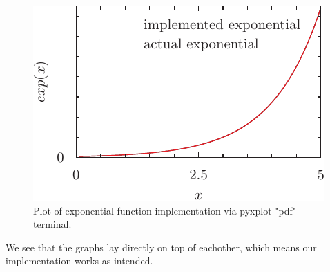 \documentclass[twocolumn]{article}
\begin{document}
\begin{figure}[h]
	\includegraphics{fig-pyxplot.pdf}
	\caption{Plot of exponential function implementation via pyxplot "pdf" terminal.}
	\label{fig:expimp}
\end{figure}
We see that the graphs lay directly on top of eachother, which means our implementation works as intended. 
\end{document}
